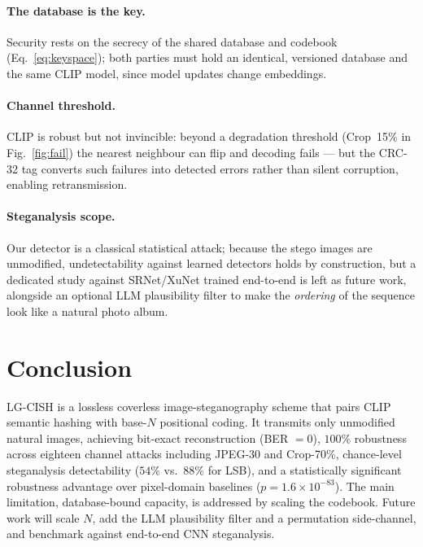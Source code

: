 \documentclass[10pt]{article}
\begin{document}
\paragraph{The database is the key.}
Security rests on the secrecy of the shared database and codebook
(Eq.~\eqref{eq:keyspace}); both parties must hold an identical, versioned database
and the same CLIP model, since model updates change embeddings.

\paragraph{Channel threshold.}
CLIP is robust but not invincible: beyond a degradation threshold (Crop~15\% in
Fig.~\ref{fig:fail}) the nearest neighbour can flip and decoding fails --- but the
CRC-32 tag converts such failures into detected errors rather than silent
corruption, enabling retransmission.

\paragraph{Steganalysis scope.}
Our detector is a classical statistical attack; because the stego images are
unmodified, undetectability against learned detectors holds by construction, but a
dedicated study against SRNet/XuNet trained end-to-end is left as future work,
alongside an optional LLM plausibility filter to make the \emph{ordering} of the
sequence look like a natural photo album.

\section{Conclusion}\label{sec:conclusion}
LG-CISH is a lossless coverless image-steganography scheme that pairs CLIP
semantic hashing with base-$N$ positional coding. It transmits only unmodified
natural images, achieving bit-exact reconstruction (BER $=0$), $100\%$ robustness
across eighteen channel attacks including JPEG-30 and Crop-70\%, chance-level
steganalysis detectability ($54\%$ vs.\ $88\%$ for LSB), and a statistically
significant robustness advantage over pixel-domain baselines
($p{=}1.6\times10^{-83}$). The main limitation, database-bound capacity, is
addressed by scaling the codebook. Future work will scale $N$, add the LLM
plausibility filter and a permutation side-channel, and benchmark against
end-to-end CNN steganalysis.
\end{document}
